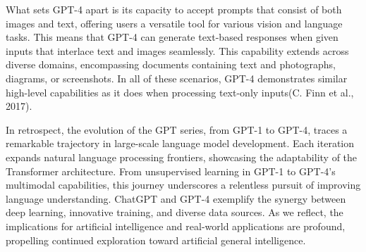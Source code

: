 \documentclass[fleqn,10pt]{thescipub} %
\begin{document}
What sets GPT-4 apart is its capacity to accept prompts that consist of both images and text, offering users a versatile tool for various vision and language tasks. This means that GPT-4 can generate text-based responses when given inputs that interlace text and images seamlessly. This capability extends across diverse domains, encompassing documents containing text and photographs, diagrams, or screenshots. In all of these scenarios, GPT-4 demonstrates similar high-level capabilities as it does when processing text-only inputs(C. Finn et al., 2017).

In retrospect, the evolution of the GPT series, from GPT-1 to GPT-4, traces a remarkable trajectory in large-scale language model development. Each iteration expands natural language processing frontiers, showcasing the adaptability of the Transformer architecture. From unsupervised learning in GPT-1 to GPT-4's multimodal capabilities, this journey underscores a relentless pursuit of improving language understanding. ChatGPT and GPT-4 exemplify the synergy between deep learning, innovative training, and diverse data sources. As we reflect, the implications for artificial intelligence and real-world applications are profound, propelling continued exploration toward artificial general intelligence.
\end{document}
